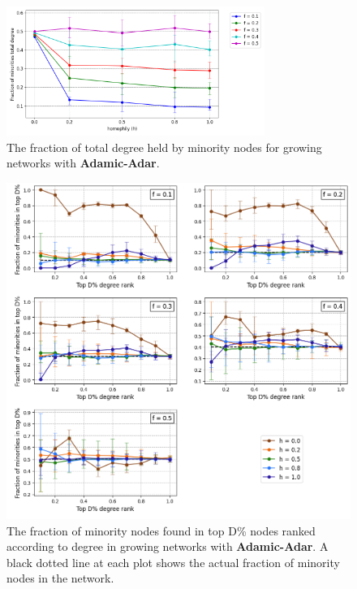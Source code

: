 \begin{figure}
	\centering
	\includegraphics[trim=0 5 0 10, clip, width=0.75\textwidth]{images/mf_growth_aa.png}
	\caption{The fraction of total degree held by minority nodes for growing networks with \textbf{Adamic-Adar}.}
	\label{mf_growth_aa_fig}
\end{figure}

\begin{figure}[h!]
	\centering
	\includegraphics[trim=0 10 0 5, clip, width=1.0\textwidth]{images/top_growth_aa.png}
	\caption{The fraction of minority nodes found in top D\% nodes ranked according to degree in growing networks with \textbf{Adamic-Adar}. A black dotted line at each plot shows the actual fraction of minority nodes in the network.}
	\label{top_growth_aa_fig}
\end{figure}

